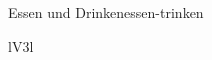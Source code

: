 \begin{discourse}{Essen und Drinken}{essen-trinken}
\begin{tabular}{lV{3}l}
	 \\
	\bline
	 \\


\end{tabular}
\end{discourse}

